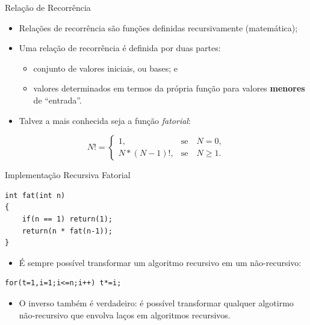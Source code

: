 \documentclass{beamer}
\begin{document}
	\begin{frame}[c]{Relação de Recorrência}
		\begin{itemize}
			\item Relações de recorrência são funções definidas recursivamente (matemática);

			\item Uma relação de recorrência é definida por duas partes:
			\begin{itemize}
				\item conjunto de valores iniciais, ou bases; e
				\item valores determinados em termos da própria função para valores \textbf{menores} de ``entrada''.
			\end{itemize}

			\item Talvez a mais conhecida seja a função \textit{fatorial}:
		\end{itemize}

		\begin{center}
			\[ N! =
			\left \{
			\begin{array}{rc}
				1,&\mbox{se}\quad N = 0,\\
				N * (N-1)!,&\mbox{se}\quad N \ge 1.
			\end{array}
			\right .
			\]
		\end{center}
	\end{frame}


	\begin{frame}[fragile,c]{Implementação Recursiva Fatorial}
	
		\begin{verbatim}
int fat(int n)
{
	if(n == 1) return(1);
	return(n * fat(n-1));
}
		\end{verbatim}

		\begin{itemize}
			\item É sempre possível transformar um algoritmo recursivo em um não-recursivo:
		\end{itemize}
	
		\begin{verbatim}
for(t=1,i=1;i<=n;i++) t*=i;
		\end{verbatim}
		\begin{itemize}
			\item O inverso também é verdadeiro: é possível transformar qualquer algotirmo não-recursivo que envolva laços em algoritmos recursivos.
		\end{itemize}
	\end{frame}
\end{document}
